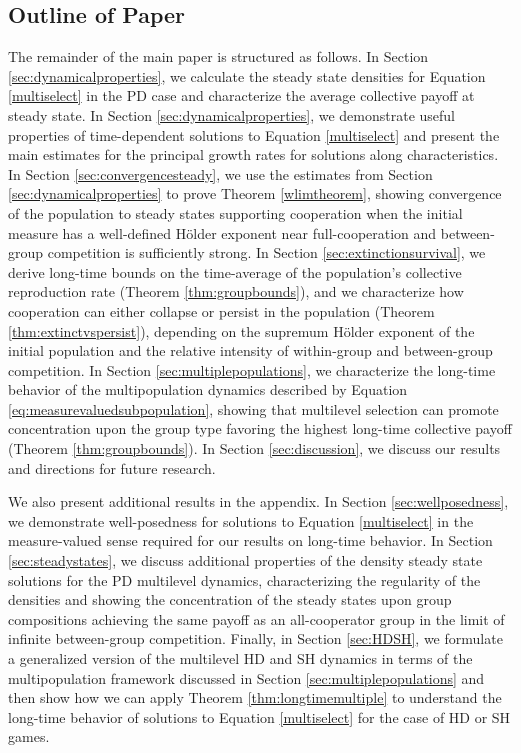 \documentclass[11pt]{article}
\numberwithin{equation}{section}
\begin{document}
{\subsection{Outline of Paper}
\label{sec:outline}
 The remainder of the main paper is structured as follows. In Section \ref{sec:dynamicalproperties}, we calculate the steady state densities for Equation \eqref{multiselect} in the PD case and characterize the average collective payoff at steady state. In Section \ref{sec:dynamicalproperties}, we demonstrate useful properties of time-dependent solutions to Equation \eqref{multiselect} and present the main estimates for the principal growth rates for solutions along characteristics. In Section \ref{sec:convergencesteady}, we use the estimates from Section \ref{sec:dynamicalproperties} to prove Theorem \ref{wlimtheorem}, showing convergence of the population to steady states supporting cooperation when the initial measure has a well-defined H{\"o}lder exponent near full-cooperation and between-group competition is sufficiently strong. In Section \ref{sec:extinctionsurvival}, we derive long-time bounds on the time-average of the population's collective reproduction rate (Theorem \ref{thm:groupbounds}), and  we characterize how cooperation can either collapse or persist in the population (Theorem \ref{thm:extinctvspersist}), depending on the supremum H{\"o}lder exponent of the initial population and the relative intensity of within-group and between-group competition. In Section \ref{sec:multiplepopulations}, we characterize the long-time behavior of the multipopulation dynamics described by Equation \eqref{eq:measurevaluedsubpopulation}, showing that multilevel selection can promote concentration upon the group type favoring the highest long-time collective payoff (Theorem \ref{thm:groupbounds}). In Section \ref{sec:discussion}, we discuss our results and directions for future research. 

 We also present additional results in the appendix. In Section \ref{sec:wellposedness}, we demonstrate well-posedness for solutions to Equation \eqref{multiselect} in the measure-valued sense required for our results on long-time behavior. In Section \ref{sec:steadystates}, we discuss additional properties of the density steady state solutions for the PD multilevel dynamics, characterizing the regularity of the densities and showing the concentration of the steady states upon group compositions achieving the same payoff as an all-cooperator group in the limit of infinite between-group competition. Finally, in Section \ref{sec:HDSH}, we formulate a generalized version of the multilevel HD and SH dynamics in terms of the multipopulation framework discussed in Section \ref{sec:multiplepopulations}
 and then show how we can apply Theorem \ref{thm:longtimemultiple} to understand the long-time behavior of solutions to Equation \eqref{multiselect} for the case of HD or SH games.



}
\end{document}
